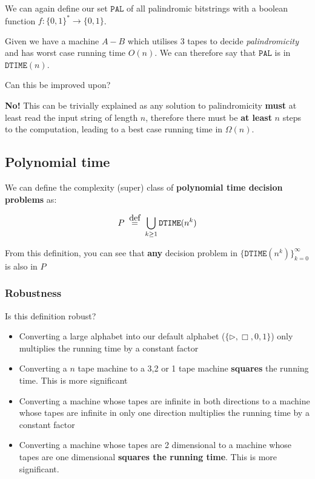 \documentclass{article}
\newcommand\defeq{\stackrel{\mathclap{\normalfont\mbox{def}}}{=}}
\begin{document}
We can again define our set $\texttt{PAL} $ of all palindromic bitstrings with a boolean function $f: \{ 0,1 \}^{*}\rightarrow \{ 0,1 \} $.

Given we have a machine $A-B$ which utilises 3 tapes to decide \textit{palindromicity}  and has worst case running time $O(n)$. We can therefore say that $\texttt{PAL} $ is in $\texttt{DTIME} (n)$.

Can this be improved upon?

\textbf{No!} This can be trivially explained as any solution to palindromicity \textbf{must} at least read the input string of length $n$, therefore there must be \textbf{at least} $n$ steps to the computation, leading to a best case running time in $\Omega(n)$.

\subsection{Polynomial time}

We can define the complexity (super) class of \textbf{polynomial time decision problems} as:

\[
  P \;\; \defeq \;\; \bigcup_{k\geq1}\texttt{DTIME} (n^{k})
\]

From this definition, you can see that \textbf{any} decision problem in $\{  \texttt{DTIME} (n^{k})\}_{k=0}^{\infty} $ is also in $P$

\subsubsection{Robustness}

Is this definition robust?

\begin{itemize}
  \item Converting a large alphabet into our default alphabet ($\{ \rhd, \Box, 0,1 \} $) only multiplies the running time by a constant factor
  \item Converting a $n$ tape machine to a 3,2 or 1 tape machine \textbf{squares} the running time. This is more significant
  \item Converting a machine whose tapes are infinite in both directions to a machine whose tapes are infinite in only one direction multiplies the running time by a constant factor
        \item Converting a machine whose tapes are 2 dimensional to a machine whose tapes are one dimensional \textbf{squares the running time}. This is more significant.
\end{itemize}
\end{document}
